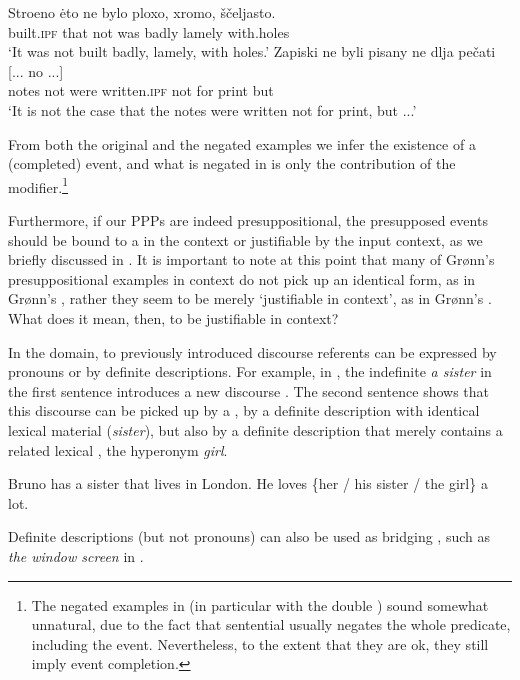 \documentclass[output=paper,modfonts,newtxmath,hidelinks]{langscibook}
\begin{document}
\ea\label{stroenoneg}
\ea\gll 	Stroeno \.{e}to ne bylo ploxo, xromo, ščeljasto. \\
	built.\textsc{ipf} that not was badly lamely with.holes\\
 \glt   `It was not built badly, lamely, with holes.'
\ex\gll 	Zapiski ne byli pisany ne dlja pečati [... no ...]	\\
	notes not were written.\textsc{ipf} not for print          {}       but {}\\
\glt    `It is not the case that the notes were written not for print, but ...'\label{stroenonegb}
\z\z

\noindent From both the original and the negated examples we infer the existence of a (completed) event, and what is negated in  is only the contribution of the modifier.\footnote{The negated examples in  (in particular  with the double ) sound somewhat unnatural, due to the fact that sentential  usually negates the whole predicate, including the event. Nevertheless, to the extent that they are ok, they still imply event completion.}

Furthermore, if our  PPPs are indeed presuppositional, the presupposed events should be bound to a  in the context or justifiable by the input context, as we briefly discussed in . It is important to note at this point that many of Grønn's presuppositional  examples in context do not pick up an identical  form, as in Grønn's , rather they seem to be merely `justifiable in context', as in Grønn's .  What does it mean, then, to be justifiable in context? 

In the  domain,  to previously introduced discourse referents can be expressed by pronouns or by definite descriptions. For example, in , the indefinite \textit{a sister} in the first sentence introduces a new discourse . The second sentence shows that this discourse  can be picked up by a , by a definite description with identical lexical material (\textit{sister}), but also by a definite description that merely contains a related lexical , the hyperonym \textit{girl}. 

\ea Bruno has a sister that lives in London. He loves \{her / his sister / the girl\} a lot.\label{Bruno}
\z

\noindent Definite descriptions (but not pronouns) can also be used as bridging , such as \textit{the window screen} in .
\end{document}
